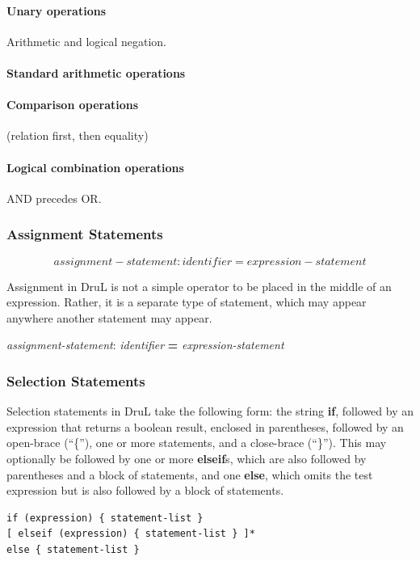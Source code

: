 \documentclass[11pt,twoside]{article}
\begin{document}
\paragraph{Unary operations}
Arithmetic and logical negation.

\paragraph{Standard arithmetic operations}

\paragraph{Comparison operations}

(relation first, then equality)

\paragraph{Logical combination operations}

AND precedes OR.

\subsubsection{Assignment Statements}

\[ assignment-statement: identifier \mathbf{=} expression-statement \]

Assignment in DruL is not a simple operator to be placed in the middle of an expression.  Rather, it is a separate type of statement, which may appear anywhere another statement may appear.  

\emph{assignment-statement}: \emph{identifier} \textbf{=}  \emph{expression-statement}

\subsubsection{Selection Statements}

Selection statements in DruL take the following form: the string \textbf{if}, followed by an expression that returns a boolean result, enclosed in parentheses, followed by an open-brace (``\{''), one or more statements, and a close-brace (``\}'').  This may optionally be followed by one or more \textbf{elseif}s, which are also followed by parentheses and a block of statements, and one \textbf{else}, which omits the test expression but is also followed by a block of statements.

\begin{verbatim}
if (expression) { statement-list } 
[ elseif (expression) { statement-list } ]*
else { statement-list }
\end{verbatim}
\end{document}
